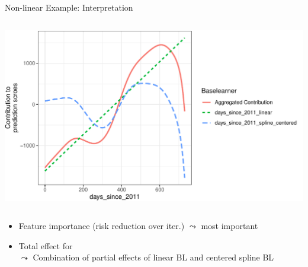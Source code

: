 \documentclass[11pt,compress,t,notes=noshow, aspectratio=169, xcolor=table]{beamer}
\begin{document}
\begin{frame}{Non-linear Example: Interpretation}
\begin{columns}[T, totalwidth = \linewidth]
{\begin{column}{0.5\linewidth}
  \includegraphics[width = \linewidth]{figure/compboost_pfe.pdf}
\end{column}
}
\end{columns}
\smallskip
\scriptsize
{}
\begin{itemize}
    \normalsize
    \item<2->  Feature importance (risk reduction over iter.) $\leadsto$  most important
    \item<2-> Total effect for \\
$\leadsto$ Combination of partial effects of linear BL and centered spline BL
\end{itemize}
\end{frame}






\end{document}
